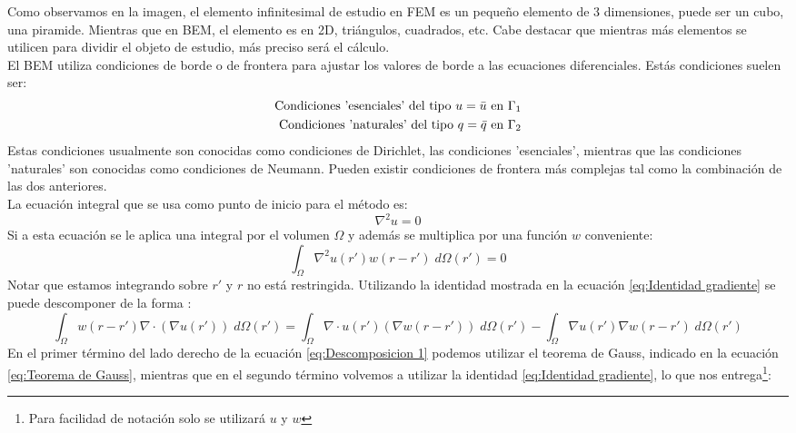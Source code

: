 \documentclass[11pt]{article}
\begin{document}
Como observamos en la imagen, el elemento infinitesimal de estudio en FEM es un pequeño elemento de 3 dimensiones, puede ser un cubo, una piramide. Mientras que en BEM, el elemento es en 2D, triángulos, cuadrados, etc. Cabe destacar que mientras más elementos se utilicen para dividir el objeto de estudio, más preciso será el cálculo.\\
El BEM utiliza condiciones de borde o de frontera para ajustar los valores de borde a las ecuaciones diferenciales. Estás condiciones suelen ser:
\begin{equation}
\label{eq:Condiciones iniciales}
\begin{split}
\textnormal{Condiciones 'esenciales' del tipo }u=\bar{u}\textnormal{ en }\Gamma_1\\
\textnormal{Condiciones 'naturales' del tipo }q=\bar{q}\textnormal{ en }\Gamma_2
\end{split}
\end{equation}
Estas condiciones usualmente son conocidas como condiciones de Dirichlet, las condiciones 'esenciales', mientras que las condiciones 'naturales' son conocidas como condiciones de Neumann. Pueden existir condiciones de frontera más complejas tal como la combinación de las dos anteriores.\\
La ecuación integral que se usa como punto de inicio para el método es:
\begin{equation}
\label{eq:Ecuacion inicial BEM}
\nabla^2u=0
\end{equation}
Si a esta ecuación se le aplica una integral por el volumen $\Omega$ y además se multiplica por una función $w$ conveniente:
\begin{equation}
\int_\Omega\nabla^2u(r')w(r-r')\;d\Omega(r')=0
\end{equation}
Notar que estamos integrando sobre $r'$ y $r$ no está restringida. Utilizando la identidad mostrada en la ecuación \eqref{eq:Identidad gradiente} se puede descomponer de la forma :
\begin{equation}
\label{eq:Descomposicion 1}
\int_\Omega w(r-r')\nabla\cdot(\nabla u(r'))\;d\Omega(r')=\int_\Omega\nabla\cdot u(r')(\nabla w(r-r'))\;d\Omega(r')-\int_\Omega\nabla u(r')\nabla w(r-r')\;d\Omega(r')
\end{equation}
En el primer término del lado derecho de la ecuación \eqref{eq:Descomposicion 1} podemos utilizar el teorema de Gauss, indicado en la ecuación \eqref{eq:Teorema de Gauss}, mientras que en el segundo término volvemos a utilizar la identidad \eqref{eq:Identidad gradiente}, lo que nos entrega\footnote{Para facilidad de notación solo se utilizará $u$ y $w$}:
\end{document}
